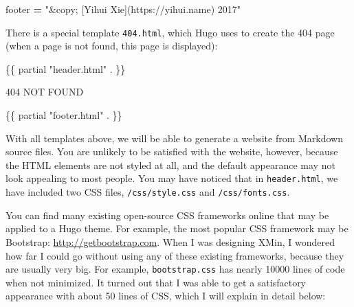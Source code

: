 \documentclass[12pt,]{krantz}
\makeatletter
\newenvironment{Shaded}{\begin{snugshade}}{\end{snugshade}}
\newcommand{\StringTok}[1]{\textcolor[rgb]{0.31,0.60,0.02}{#1}}
\newcommand{\OperatorTok}[1]{\textcolor[rgb]{0.81,0.36,0.00}{\textbf{#1}}}
\newcommand{\NormalTok}[1]{#1}
\newenvironment{kframe}{%
\medskip{}
\setlength{\fboxsep}{.8em}
 \def\at@end@of@kframe{}%
 \ifinner\ifhmode%
  \def\at@end@of@kframe{\end{minipage}}%
  \begin{minipage}{\columnwidth}%
 \fi\fi%
 \def\FrameCommand##1{\hskip\@totalleftmargin \hskip-\fboxsep
 \colorbox{shadecolor}{##1}\hskip-\fboxsep
     \hskip-\linewidth \hskip-\@totalleftmargin \hskip\columnwidth}%
 \MakeFramed {\advance\hsize-\width
   \@totalleftmargin\z@ \linewidth\hsize
   \@setminipage}}%
 {\par\unskip\endMakeFramed%
 \at@end@of@kframe}
\renewenvironment{Shaded}{\begin{kframe}}{\end{kframe}}
\theoremstyle{definition}
\theoremstyle{definition}
\theoremstyle{definition}
\theoremstyle{remark}
\makeatother
\begin{document}
\begin{itemize}
\begin{itemize}
\begin{Shaded}
\begin{Highlighting}[]
\NormalTok{[params]}
\NormalTok{    footer }\OperatorTok{=} \StringTok{"&copy; [Yihui Xie](https://yihui.name) 2017"}
\end{Highlighting}
\end{Shaded}
  \end{itemize}
\end{itemize}

There is a special template \texttt{404.html}, which Hugo uses to create
the 404 page (when a page is not found, this page is
displayed):

\begin{Shaded}
\begin{Highlighting}[]
\NormalTok{\{\{ partial "header.html" . \}\}}

\NormalTok{404 NOT FOUND}

\NormalTok{\{\{ partial "footer.html" . \}\}}
\end{Highlighting}
\end{Shaded}

With all templates above, we will be able to generate a website from
Markdown source files. You are unlikely to be satisfied with the
website, however, because the HTML elements are not styled at all, and
the default appearance may not look appealing to most people. You may
have noticed that in \texttt{header.html}, we have included two CSS
files, \texttt{/css/style.css} and \texttt{/css/fonts.css}.

You can find many existing open-source CSS frameworks online that may be
applied to a Hugo theme. For example, the most popular CSS framework may
be Bootstrap: \url{http://getbootstrap.com}. When I was designing XMin,
I wondered how far I could go without using any of these existing
frameworks, because they are usually very big. For example,
\texttt{bootstrap.css} has nearly 10000 lines of code when not
minimized. It turned out that I was able to get a satisfactory
appearance with about 50 lines of CSS, which I will explain in detail
below:
\end{document}
